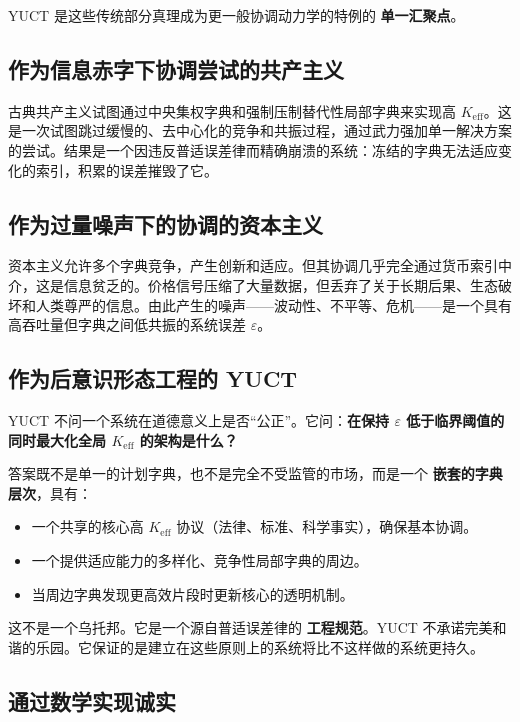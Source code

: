 \documentclass[12pt,a4paper]{article}
\newcommand{\Keff}{K_{\mathrm{eff}}}
\begin{document}
	YUCT 是这些传统部分真理成为更一般协调动力学的特例的 \textbf{单一汇聚点}。
	
	\subsection{作为信息赤字下协调尝试的共产主义}
	
	古典共产主义试图通过中央集权字典和强制压制替代性局部字典来实现高 \(\Keff\)。这是一次试图跳过缓慢的、去中心化的竞争和共振过程，通过武力强加单一解决方案的尝试。结果是一个因违反普适误差律而精确崩溃的系统：冻结的字典无法适应变化的索引，积累的误差摧毁了它。
	
	\subsection{作为过量噪声下的协调的资本主义}
	
	资本主义允许多个字典竞争，产生创新和适应。但其协调几乎完全通过货币索引中介，这是信息贫乏的。价格信号压缩了大量数据，但丢弃了关于长期后果、生态破坏和人类尊严的信息。由此产生的噪声——波动性、不平等、危机——是一个具有高吞吐量但字典之间低共振的系统误差 \(\varepsilon\)。
	
	\subsection{作为后意识形态工程的 YUCT}
	
	YUCT 不问一个系统在道德意义上是否“公正”。它问：\textbf{在保持 \(\varepsilon\) 低于临界阈值的同时最大化全局 \(K_{\mathrm{eff}}\) 的架构是什么？}
	
	答案既不是单一的计划字典，也不是完全不受监管的市场，而是一个 \textbf{嵌套的字典层次}，具有：
	\begin{itemize}[leftmargin=*]
		\item 一个共享的核心高 \(\Keff\) 协议（法律、标准、科学事实），确保基本协调。
		\item 一个提供适应能力的多样化、竞争性局部字典的周边。
		\item 当周边字典发现更高效片段时更新核心的透明机制。
	\end{itemize}
	
	这不是一个乌托邦。它是一个源自普适误差律的 \textbf{工程规范}。YUCT 不承诺完美和谐的乐园。它保证的是建立在这些原则上的系统将比不这样做的系统更持久。
	
	\subsection{通过数学实现诚实}
	
\end{document}
